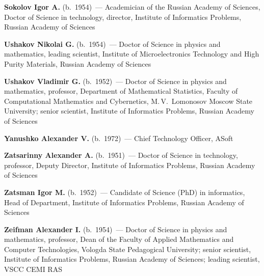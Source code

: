 \begin{multicols}{2}
\vspace*{3pt}

\noindent 
\textbf{Sokolov Igor A.} (b.\ 1954)~--- Academician of the Russian Academy of Sciences,
Doctor of Science in technology, director,
Institute of Informatics Problems,  Russian Academy of Sciences

\vspace*{3pt}

\noindent 
\textbf{Ushakov Nikolai G.} (b.\ 1954)~--- Doctor of Science in physics and mathematics,
leading scientist, Institute of Microelectronics Technology and High Purity Materials,
Russian Academy of Sciences

\vspace*{3pt}

\noindent 
\textbf{Ushakov Vladimir G.} (b.\ 1952)~--- Doctor of Science in physics and mathematics,
professor, Department of Mathematical Statistics, Faculty of Computational Mathematics and Cybernetics,
M.\,V.~Lomonosov Moscow State University; senior scientist, Institute of Informatics Problems, 
Russian Academy of Sciences

\vspace*{3pt}

\noindent 
\textbf{Yanushko Alexander V.} (b.\ 1972)~--- Chief Technology Officer, ASoft

\vspace*{3pt}

\noindent
\textbf{Zatsarinny Alexander A.} (b.\ 1951)~--- Doctor of Science in technology, 
professor, Deputy Director, Institute of Informatics Problems, Russian Academy of Sciences

\vspace*{3pt}

\noindent
\textbf{Zatsman Igor M.} (b.\ 1952)~--- Candidate of Science (PhD) in informatics, 
Head of Department, Institute of Informatics Problems, Russian Academy of Sciences

\vspace*{3pt}

\noindent
\textbf{Zeifman Alexander I.} (b.\ 1954)~--- Doctor of Science in physics and
mathematics, professor, Dean of the Faculty of Applied Mathematics
and Computer Technologies, Vologda State Pedagogical University;
senior scientist, Institute of Informatics Problems, Russian Academy of Sciences; leading
scientist, VSCC CEMI RAS



\end{multicols}
\newpage